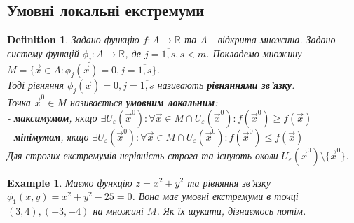 \documentclass[a4paper, 10pt]{article}
\def\departial#1#2{\dfrac{\partial {#1}}{\partial {#2}}}
\theoremstyle{theoremdd}
\theoremstyle{theoremdd}
\theoremstyle{theoremdd}
\newtheorem{definition}[theorem]{Definition}
\theoremstyle{theoremdd}
\theoremstyle{theoremdd}
\newtheorem{example}[theorem]{Example}
\theoremstyle{theoremdd}
\theoremstyle{theoremdd}
\theoremstyle{theoremdd}
\theoremstyle{theoremdd}
\begin{document}
\iffalse
\subsection{Умовні локальні екстремуми}
\begin{definition}
Задано функцію $f: A \to \mathbb{R}$ та $A$ - відкрита множина. Задано систему функцій $\phi_j: A \to \mathbb{R}$, де $j = \overline{1,s}, s < m$. Покладемо множину $M = \{\vec{x} \in A: \phi_j(\vec{x}) = 0, j = \overline{1,s} \}$.\\
\iffalse
$\rank \begin{pmatrix}
\departial{\phi_1}{x_1} & \dots & \departial{\phi_1}{x_n} \\
\vdots & \ddots & \vdots \\
\departial{\phi_s}{x_1} & \dots & \departial{\phi_s}{x_n}
\end{pmatrix}(\vec{x}^0) = s$ - деякий максимально можливий ранг.\\
\fi
Тоді рівняння $\phi_j(\vec{x}) = 0, j=\overline{1,s}$ називають \textbf{рівняннями зв'язку}.\\
Точка $\vec{x}^0 \in M$ називається \textbf{умовним локальним}:\\
- \textbf{максимумом}, якщо $\exists U_{\varepsilon}(\vec{x}^0): \forall \vec{x} \in M \cap U_{\varepsilon}(\vec{x}^0): f(\vec{x}^0) \geq f(\vec{x})$ \\
- \textbf{мінімумом}, якщо $\exists U_{\varepsilon}(\vec{x}^0): \forall \vec{x} \in M \cap U_{\varepsilon}(\vec{x}^0): f(\vec{x}^0) \leq f(\vec{x})$\\
Для строгих екстремумів нерівність строга та існують околи $U_\varepsilon (\vec{x}^0) \setminus \{\vec{x}^0\}$.
\end{definition}

\begin{example}
Маємо функцію $z = x^2+y^2$ та рівняння зв'язку $\phi_1(x,y) = x^2+y^2-25=0$. Вона має умовні екстремуми в точці $(3,4), (-3,-4)$ на множині $M$. Як їх шукати, дізнаємось потім.
\end{example}
\end{document}
